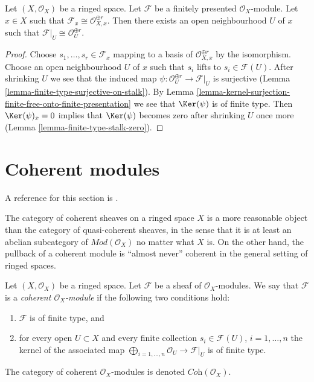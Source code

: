 \begin{lemma}
\label{lemma-finite-presentation-stalk-free}
Let $(X, \mathcal{O}_X)$ be a ringed space. Let $\mathcal{F}$ be
a finitely presented $\mathcal{O}_X$-module. Let $x \in X$ such that
$\mathcal{F}_x \cong \mathcal{O}_{X, x}^{\oplus r}$. Then there exists
an open neighbourhood $U$ of $x$ such that
$\mathcal{F}|_U \cong \mathcal{O}_U^{\oplus r}$.
\end{lemma}

\begin{proof}
Choose $s_1, \ldots, s_r \in \mathcal{F}_x$ mapping to a basis of
$\mathcal{O}_{X, x}^{\oplus r}$ by the isomorphism. Choose an open
neighbourhood $U$ of $x$ such that $s_i$ lifts to $s_i \in \mathcal{F}(U)$.
After shrinking $U$ we see that the induced map
$\psi : \mathcal{O}_U^{\oplus r} \to \mathcal{F}|_U$ is surjective
(Lemma \ref{lemma-finite-type-surjective-on-stalk}).
By Lemma \ref{lemma-kernel-surjection-finite-free-onto-finite-presentation}
we see that $\Ker(\psi)$ is of finite type.
Then $\Ker(\psi)_x = 0$ implies that $\Ker(\psi)$ becomes zero
after shrinking $U$ once more (Lemma \ref{lemma-finite-type-stalk-zero}).
\end{proof}





\section{Coherent modules}
\label{section-coherent}

\noindent
A reference for this section is \cite{FAC}.

\medskip\noindent
The category of coherent sheaves on a ringed space $X$
is a more reasonable object
than the category of quasi-coherent sheaves, in the sense
that it is at least an abelian subcategory of $\textit{Mod}(\mathcal{O}_X)$
no matter what $X$ is. On the other hand, the pullback of a
coherent module is ``almost never'' coherent in the general setting
of ringed spaces.

\begin{definition}
\label{definition-coherent}
Let $(X, \mathcal{O}_X)$ be a ringed space.
Let $\mathcal{F}$ be a sheaf of $\mathcal{O}_X$-modules.
We say that $\mathcal{F}$ is a {\it coherent $\mathcal{O}_X$-module}
if the following two conditions hold:
\begin{enumerate}
\item $\mathcal{F}$ is of finite type, and
\item for every open $U \subset X$ and every finite
collection $s_i \in \mathcal{F}(U)$, $i = 1, \ldots, n$
the kernel of the associated map
$\bigoplus_{i = 1, \ldots, n} \mathcal{O}_U \to \mathcal{F}|_U$
is of finite type.
\end{enumerate}
The category of coherent $\mathcal{O}_X$-modules is denoted
$\textit{Coh}(\mathcal{O}_X)$.
\end{definition}

